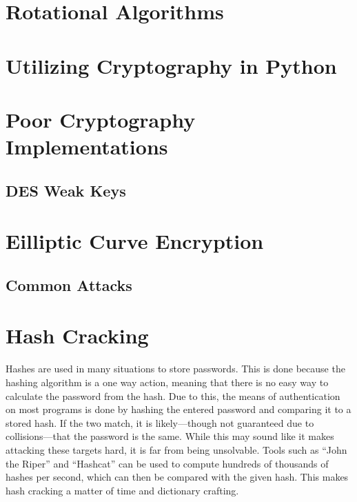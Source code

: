 \documentclass[a4paper,11pt]{report}
\begin{document}
	\section{Rotational Algorithms}
	\section{Utilizing Cryptography in Python}
	\section{Poor Cryptography Implementations}
		\subsection{DES Weak Keys}
	\section{Eilliptic Curve Encryption}
		\subsection{Common Attacks}
	\section{Hash Cracking}
		Hashes are used in many situations to store passwords. 
		This is done because the hashing algorithm is a one way action, meaning that there is no easy way to calculate the password from the hash. 
		Due to this, the means of authentication on most programs is done by hashing the entered password and comparing it to a stored hash. 
		If the two match, it is likely---though not guaranteed due to collisions---that the password is the same. 
		While this may sound like it makes attacking these targets hard, it is far from being unsolvable. 
		Tools such as ``John the Riper'' and ``Hashcat'' can be used to compute hundreds of thousands of hashes per second, which can then be compared with the given hash. 
		This makes hash cracking a matter of time and dictionary crafting. 
\end{document}
